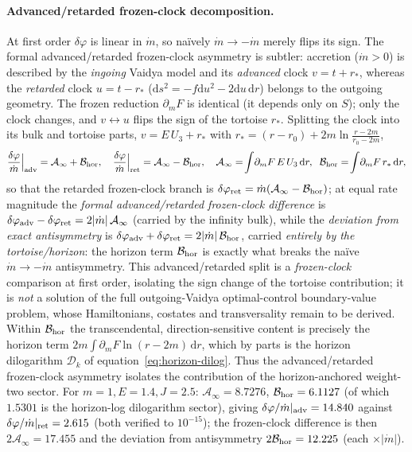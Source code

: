 \documentclass[12pt]{iopart}
\newcommand{\dd}{\mathrm{d}}
\begin{document}
\paragraph{Advanced/retarded frozen-clock decomposition.} At first order $\delta\varphi$ is
linear in $\dot m$, so na\"ively $\dot m\to-\dot m$ merely flips its sign. The
formal advanced/retarded frozen-clock asymmetry is subtler: accretion ($\dot m>0$) is
described by the \emph{ingoing} Vaidya model and its \emph{advanced} clock $v=t+r_*$,
whereas the \emph{retarded} clock $u=t-r_*$ ($\dd s^2=-f\dd u^2-2\dd u\,\dd r$) belongs to
the outgoing geometry. The frozen reduction $\partial_m F$ is identical
(it depends only on $S$); only the clock changes, and $v\leftrightarrow u$ flips the
sign of the tortoise $r_*$. Splitting the clock into its bulk and tortoise parts,
$v=E\,U_3+r_*$ with $r_*=(r-r_0)+2m\ln\!\frac{r-2m}{r_0-2m}$,
\begin{equation}
    \frac{\delta\varphi}{\dot m}\Big|_{\rm adv}=\mathcal{A}_\infty+\mathcal{B}_{\rm hor},
    \quad
    \frac{\delta\varphi}{\dot m}\Big|_{\rm ret}=\mathcal{A}_\infty-\mathcal{B}_{\rm hor},
    \quad
    \mathcal{A}_\infty=\!\int\!\partial_m F\,E\,U_3\,\dd r,\;\;
    \mathcal{B}_{\rm hor}=\!\int\!\partial_m F\,r_*\,\dd r,
    \label{eq:vaidya-asymmetry}
\end{equation}
so that the retarded frozen-clock branch is
$\delta\varphi_{\rm ret}=\dot m(\mathcal{A}_\infty-\mathcal{B}_{\rm hor})$; at equal
rate magnitude the \emph{formal advanced/retarded frozen-clock difference} is
$\delta\varphi_{\rm adv}-\delta\varphi_{\rm ret}=2|\dot m|\,\mathcal{A}_\infty$
(carried by the infinity bulk), while the \emph{deviation from exact antisymmetry} is
$\delta\varphi_{\rm adv}+\delta\varphi_{\rm ret}=2|\dot m|\,\mathcal{B}_{\rm hor}$,
carried \emph{entirely by the tortoise/horizon}: the horizon term $\mathcal{B}_{\rm hor}$
is exactly what breaks the na\"ive $\dot m\to-\dot m$ antisymmetry. This
advanced/retarded split is a \emph{frozen-clock} comparison at first order, isolating the
sign change of the tortoise contribution; it is \emph{not} a solution of the full
outgoing-Vaidya optimal-control boundary-value problem, whose Hamiltonians, costates and
transversality remain to be derived. Within
$\mathcal{B}_{\rm hor}$ the transcendental, direction-sensitive content is precisely
the horizon term $2m\!\int\!\partial_m F\ln(r-2m)\,\dd r$, which by parts is the
horizon dilogarithm $\mathcal{D}_k$ of equation~\eqref{eq:horizon-dilog}. Thus the
advanced/retarded frozen-clock asymmetry isolates the contribution of the
horizon-anchored weight-two sector. For
$m=1,E=1.4,J=2.5$: $\mathcal{A}_\infty=8.7276$, $\mathcal{B}_{\rm hor}=6.1127$ (of which
$1.5301$ is the horizon-log dilogarithm sector), giving
$\delta\varphi/\dot m|_{\rm adv}=14.840$ against
$\delta\varphi/\dot m|_{\rm ret}=2.615$ (both verified to $10^{-15}$); the frozen-clock
difference is then $2\mathcal{A}_\infty=17.455$ and the deviation from antisymmetry
$2\mathcal{B}_{\rm hor}=12.225$ (each $\times|\dot m|$).
\end{document}
